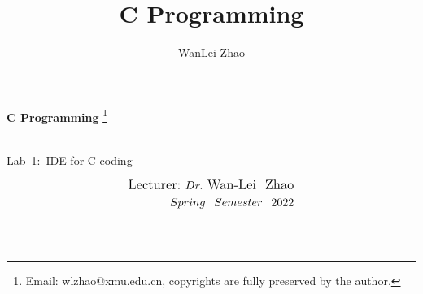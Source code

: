 \documentclass[t]{beamer}
\title{C Programming}
\author{WanLei Zhao}
\newcommand\blfootnote[1]{
  \begingroup
  \renewcommand\thefootnote{}\footnote{#1}
  \addtocounter{footnote}{-1}
  \endgroup
}
\begin{document}
\begin{frame}
   \begin{center}
    \vspace{24pt}
    \Huge\textbf{C Programming}\blfootnote{Email: wlzhao@xmu.edu.cn, copyrights are fully preserved by the author.}\\
     \Huge{\mbox{Lab 1: }IDE for C coding}
    \vspace{36pt}
  \end{center}
  \begin{align*}
   \vspace{18pt}
      \large{\mbox{Lecturer:}~Dr.~\mbox{Wan-Lei~~Zhao}} \\
      \large{Spring~~Semester~~2022} \\
   \vspace{30pt}
  \end{align*}
\end{frame}




\section{}
\end{document}
